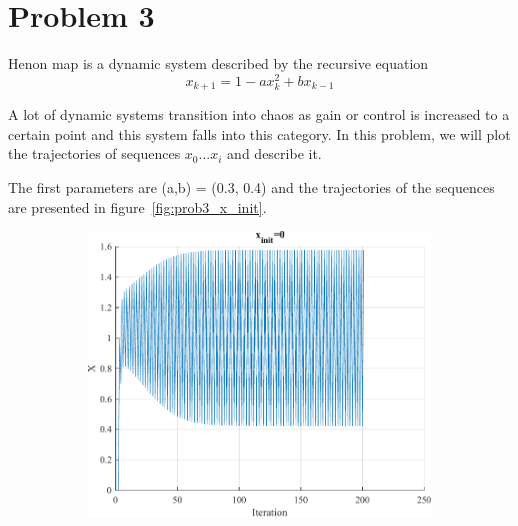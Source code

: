 \section{Problem 3}

Henon map is a dynamic system described by the recursive equation 
\[
x_{k+1} = 1 - ax^2_k + bx_{k-1}
\]

A lot of dynamic systems transition into chaos as gain or control is increased to a certain point and this system falls into this category.
In this problem, we will plot the trajectories of sequences $x_0 ... x_i$ and describe it.

The first parameters are (a,b) = (0.3, 0.4) and the trajectories of the sequences are presented in figure~\ref{fig:prob3_x_init}.

\begin{figure}[htpb]
	\centering
	\begin{subfigure}{.47\textwidth}
		\centering
		\includegraphics[width=\textwidth]{../Problem 3/prob3_x_init_0.pdf}
		\caption{}
	\end{subfigure}
	\hspace{1mm}
	\begin{subfigure}{.47\textwidth}
		\centering

\end{subfigure}
\end{figure}
